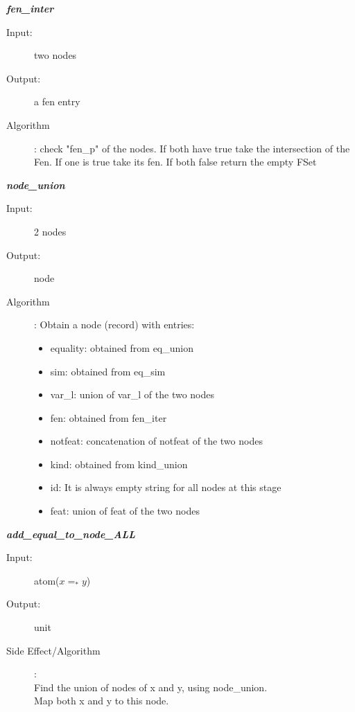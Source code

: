 \documentclass[12pt]{article}
\begin{document}
\begin{description}
\item \textbf{\textit{fen\_inter}}
\begin{description}
    \item[Input:] two nodes
    \item[Output:] a fen entry
    \item[Algorithm]: check "fen\_p" of the nodes. If both have true take the intersection of the Fen. If one is true take its fen. If both false return the empty FSet
\end{description}

\item \textbf{\textit{node\_union}}
\begin{description}
    \item[Input:] 2 nodes
    \item[Output:] node
    \item[Algorithm]: Obtain a node (record) with entries: 
    \begin{itemize}
    \item equality: obtained from eq\_union
    \item sim: obtained from eq\_sim
    \item var\_l: union of var\_l of the two nodes
    \item fen: obtained from fen\_iter
    \item notfeat: concatenation of notfeat of the two nodes
    \item kind: obtained from kind\_union
    \item id: It is always empty string for all nodes at this stage
    \item feat: union of feat of the two nodes
    \end{itemize}
\end{description}

\item \textbf{\textit{add\_equal\_to\_node\_ALL}}
\begin{description}
    \item[Input:] atom($x =_* y$)
    \item[Output:] unit
    \item[Side Effect/Algorithm]:\\ Find the union of nodes of x and y, using node\_union.\\
    Map both x and y to this node.\\
\end{description}


\end{description}
\end{document}
